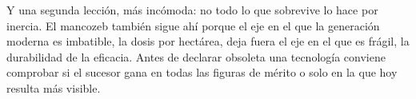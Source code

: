 \documentclass[11pt,letterpaper]{article}
\begin{document}
Y una segunda lección, más incómoda: no todo lo que sobrevive lo hace por
inercia. El mancozeb también sigue ahí porque el eje en el que la generación
moderna es imbatible, la dosis por hectárea, deja fuera el eje en el que es
frágil, la durabilidad de la eficacia. Antes de declarar obsoleta una tecnología
conviene comprobar si el sucesor gana en todas las figuras de mérito o solo en
la que hoy resulta más visible.

\printbibliography[title={Referencias bibliográficas}]
\end{document}
